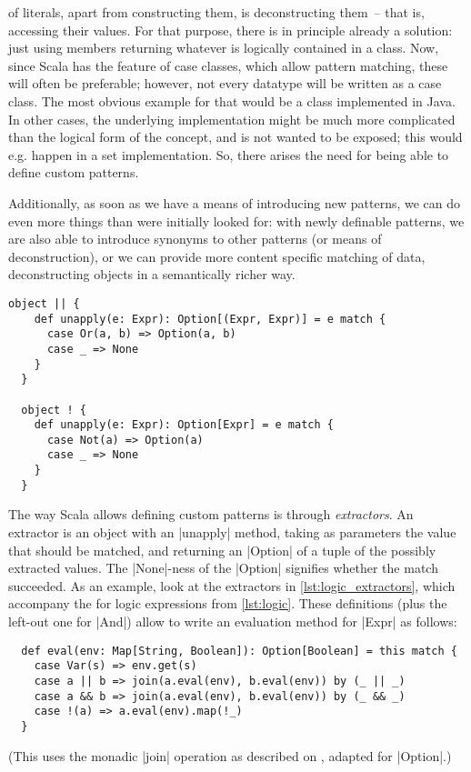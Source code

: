 of literals, apart from constructing them, is deconstructing
them~-- that is, accessing their values. For that purpose, there is in principle already a solution:
just using members returning whatever is logically contained in a class. Now, since Scala has the
feature of case classes, which allow pattern matching, these will often be preferable; however, not
every datatype will be written as a case class. The most obvious example for that would be a class
implemented in Java. In other cases, the underlying implementation might be much more complicated
than the logical form of the concept, and is not wanted to be exposed; this would e.g. happen in a
set implementation. So, there arises the need for being able to define custom patterns.

Additionally, as soon as we have a means of introducing new patterns, we can do even more things
than were initially looked for: with newly definable patterns, we are also able to introduce
synonyms to other patterns (or means of deconstruction), or we can provide more content specific
matching of data, deconstructing objects in a semantically richer way.

\begin{lstlisting}[style=floating, label=lst:logic_extractors,
  caption={Extractor objects for disjunction and negation, as defined in
    \autoref{lst:logic}. Conjunction is analogous to disjunction. Note that, since there are no
    unary tuples in Scala, \lstinline|unapply| for \lstinline|!| only needs to return
    \lstinline|Option\[Expr\]|.
    \hfill\github{dsl-examples/blob/master/src/main/scala/dsl_examples/Logic.scala}}]
  object || {
    def unapply(e: Expr): Option[(Expr, Expr)] = e match {
      case Or(a, b) => Option(a, b)
      case _ => None
    }
  }

  object ! {
    def unapply(e: Expr): Option[Expr] = e match {
      case Not(a) => Option(a)
      case _ => None
    }
  }
\end{lstlisting}

The way Scala allows defining custom patterns is through \emph{extractors}. An extractor is an
object with an |unapply| method, taking as parameters the value that should be matched, and
returning an |Option| of a tuple of the possibly extracted values. The |None|-ness of the |Option|
signifies whether the match succeeded. As an example, look at the extractors in
\autoref{lst:logic_extractors}, which accompany the \dsl{} for logic expressions from
\autoref{lst:logic}. These definitions (plus the left-out one for |And|) allow to write an
evaluation method for |Expr| as follows:
\begin{lstlisting}
  def eval(env: Map[String, Boolean]): Option[Boolean] = this match {
    case Var(s) => env.get(s)
    case a || b => join(a.eval(env), b.eval(env)) by (_ || _)
    case a && b => join(a.eval(env), b.eval(env)) by (_ && _)
    case !(a) => a.eval(env).map(!_)
  }
\end{lstlisting}
(This uses the monadic |join| operation as described on , adapted for
|Option|.)

